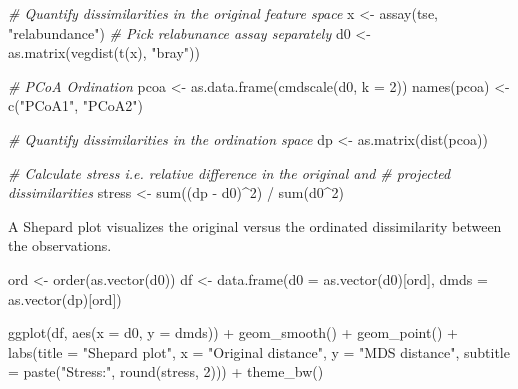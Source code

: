 \documentclass[
]{book}
\newenvironment{Shaded}{\begin{snugshade}}{\end{snugshade}}
\newcommand{\AttributeTok}[1]{\textcolor[rgb]{0.77,0.63,0.00}{#1}}
\newcommand{\CommentTok}[1]{\textcolor[rgb]{0.56,0.35,0.01}{\textit{#1}}}
\newcommand{\DecValTok}[1]{\textcolor[rgb]{0.00,0.00,0.81}{#1}}
\newcommand{\FunctionTok}[1]{\textcolor[rgb]{0.00,0.00,0.00}{#1}}
\newcommand{\NormalTok}[1]{#1}
\newcommand{\OtherTok}[1]{\textcolor[rgb]{0.56,0.35,0.01}{#1}}
\newcommand{\SpecialCharTok}[1]{\textcolor[rgb]{0.00,0.00,0.00}{#1}}
\newcommand{\StringTok}[1]{\textcolor[rgb]{0.31,0.60,0.02}{#1}}
\begin{document}
\begin{Shaded}
\begin{Highlighting}[]
\CommentTok{\# Quantify dissimilarities in the original feature space}
\NormalTok{x }\OtherTok{\textless{}{-}} \FunctionTok{assay}\NormalTok{(tse, }\StringTok{"relabundance"}\NormalTok{) }\CommentTok{\# Pick relabunance assay separately}
\NormalTok{d0 }\OtherTok{\textless{}{-}} \FunctionTok{as.matrix}\NormalTok{(}\FunctionTok{vegdist}\NormalTok{(}\FunctionTok{t}\NormalTok{(x), }\StringTok{"bray"}\NormalTok{))}

\CommentTok{\# PCoA Ordination}
\NormalTok{pcoa }\OtherTok{\textless{}{-}} \FunctionTok{as.data.frame}\NormalTok{(}\FunctionTok{cmdscale}\NormalTok{(d0, }\AttributeTok{k =} \DecValTok{2}\NormalTok{))}
\FunctionTok{names}\NormalTok{(pcoa) }\OtherTok{\textless{}{-}} \FunctionTok{c}\NormalTok{(}\StringTok{"PCoA1"}\NormalTok{, }\StringTok{"PCoA2"}\NormalTok{)}

\CommentTok{\# Quantify dissimilarities in the ordination space}
\NormalTok{dp }\OtherTok{\textless{}{-}} \FunctionTok{as.matrix}\NormalTok{(}\FunctionTok{dist}\NormalTok{(pcoa))}

\CommentTok{\# Calculate stress i.e. relative difference in the original and}
\CommentTok{\# projected dissimilarities}
\NormalTok{stress }\OtherTok{\textless{}{-}} \FunctionTok{sum}\NormalTok{((dp }\SpecialCharTok{{-}}\NormalTok{ d0)}\SpecialCharTok{\^{}}\DecValTok{2}\NormalTok{) }\SpecialCharTok{/} \FunctionTok{sum}\NormalTok{(d0}\SpecialCharTok{\^{}}\DecValTok{2}\NormalTok{)}
\end{Highlighting}
\end{Shaded}

A Shepard plot visualizes the original versus the ordinated dissimilarity
between the observations.

\begin{Shaded}
\begin{Highlighting}[]
\NormalTok{ord }\OtherTok{\textless{}{-}} \FunctionTok{order}\NormalTok{(}\FunctionTok{as.vector}\NormalTok{(d0))}
\NormalTok{df }\OtherTok{\textless{}{-}} \FunctionTok{data.frame}\NormalTok{(}\AttributeTok{d0 =} \FunctionTok{as.vector}\NormalTok{(d0)[ord],}
                 \AttributeTok{dmds =} \FunctionTok{as.vector}\NormalTok{(dp)[ord])}

\FunctionTok{ggplot}\NormalTok{(df, }\FunctionTok{aes}\NormalTok{(}\AttributeTok{x =}\NormalTok{ d0, }\AttributeTok{y =}\NormalTok{ dmds)) }\SpecialCharTok{+}
  \FunctionTok{geom\_smooth}\NormalTok{() }\SpecialCharTok{+}
  \FunctionTok{geom\_point}\NormalTok{() }\SpecialCharTok{+}    
  \FunctionTok{labs}\NormalTok{(}\AttributeTok{title =} \StringTok{"Shepard plot"}\NormalTok{,}
       \AttributeTok{x =} \StringTok{"Original distance"}\NormalTok{,}
       \AttributeTok{y =} \StringTok{"MDS distance"}\NormalTok{,   }
       \AttributeTok{subtitle =} \FunctionTok{paste}\NormalTok{(}\StringTok{"Stress:"}\NormalTok{, }\FunctionTok{round}\NormalTok{(stress, }\DecValTok{2}\NormalTok{))) }\SpecialCharTok{+}
  \FunctionTok{theme\_bw}\NormalTok{()}
\end{Highlighting}
\end{Shaded}
\end{document}
